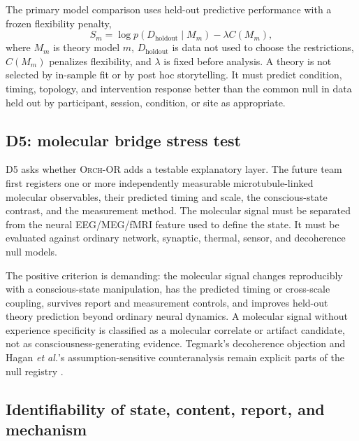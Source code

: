 \documentclass[conference]{IEEEtran}
\newcommand{\ORCH}{\textsc{Orch-OR}}
\begin{document}
The primary model comparison uses held-out predictive performance with a frozen flexibility penalty,
\begin{equation}
S_m=\log p(D_{\mathrm{holdout}}\mid M_m)-\lambda C(M_m),
\label{eq:modelscore}
\end{equation}
where $M_m$ is theory model $m$, $D_{\mathrm{holdout}}$ is data not used to choose the restrictions, $C(M_m)$ penalizes flexibility, and $\lambda$ is fixed before analysis. A theory is not selected by in-sample fit or by post hoc storytelling. It must predict condition, timing, topology, and intervention response better than the common null in data held out by participant, session, condition, or site as appropriate.

\subsection{D5: molecular bridge stress test}

D5 asks whether \ORCH{} adds a testable explanatory layer. The future team first registers one or more independently measurable microtubule-linked molecular observables, their predicted timing and scale, the conscious-state contrast, and the measurement method. The molecular signal must be separated from the neural EEG/MEG/fMRI feature used to define the state. It must be evaluated against ordinary network, synaptic, thermal, sensor, and decoherence null models.

The positive criterion is demanding: the molecular signal changes reproducibly with a conscious-state manipulation, has the predicted timing or cross-scale coupling, survives report and measurement controls, and improves held-out theory prediction beyond ordinary neural dynamics. A molecular signal without experience specificity is classified as a molecular correlate or artifact candidate, not as consciousness-generating evidence. Tegmark's decoherence objection and Hagan \textit{et al.}'s assumption-sensitive counteranalysis remain explicit parts of the null registry \cite{tegmark2000,hagan2002}.

\subsection{Identifiability of state, content, report, and mechanism}
\end{document}
